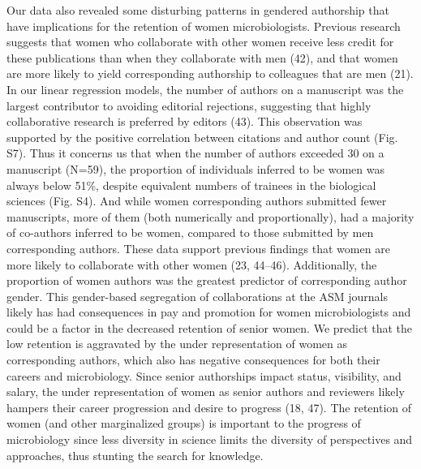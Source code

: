 \documentclass[11pt,]{article}
\begin{document}
Our data also revealed some disturbing patterns in gendered authorship
that have implications for the retention of women microbiologists.
Previous research suggests that women who collaborate with other women
receive less credit for these publications than when they collaborate
with men (42), and that women are more likely to yield corresponding
authorship to colleagues that are men (21). In our linear regression
models, the number of authors on a manuscript was the largest
contributor to avoiding editorial rejections, suggesting that highly
collaborative research is preferred by editors (43). This observation
was supported by the positive correlation between citations and author
count (Fig. S7). Thus it concerns us that when the number of authors
exceeded 30 on a manuscript (N=59), the proportion of individuals
inferred to be women was always below 51\%, despite equivalent numbers
of trainees in the biological sciences (Fig. S4). And while women
corresponding authors submitted fewer manuscripts, more of them (both
numerically and proportionally), had a majority of co-authors inferred
to be women, compared to those submitted by men corresponding authors.
These data support previous findings that women are more likely to
collaborate with other women (23, 44--46). Additionally, the proportion
of women authors was the greatest predictor of corresponding author
gender. This gender-based segregation of collaborations at the ASM
journals likely has had consequences in pay and promotion for women
microbiologists and could be a factor in the decreased retention of
senior women. We predict that the low retention is aggravated by the
under representation of women as corresponding authors, which also has
negative consequences for both their careers and microbiology. Since
senior authorships impact status, visibility, and salary, the under
representation of women as senior authors and reviewers likely hampers
their career progression and desire to progress (18, 47). The retention
of women (and other marginalized groups) is important to the progress of
microbiology since less diversity in science limits the diversity of
perspectives and approaches, thus stunting the search for knowledge.
\end{document}
